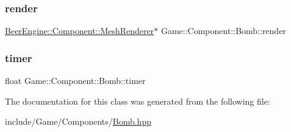 \mbox{\label{class_game_1_1_component_1_1_bomb_ae70ae4cc38793d675183efa64ac25f36}} 
\subsubsection{\texorpdfstring{render}{render}}
{\footnotesize\ttfamily \mbox{\hyperlink{class_beer_engine_1_1_component_1_1_mesh_renderer}{Beer\+Engine\+::\+Component\+::\+Mesh\+Renderer}}$\ast$ Game\+::\+Component\+::\+Bomb\+::render\hspace{0.3cm}{\ttfamily [protected]}}

\mbox{\label{class_game_1_1_component_1_1_bomb_a4c1dc12e98181874a406edd83b98ffa1}} 
\subsubsection{\texorpdfstring{timer}{timer}}
{\footnotesize\ttfamily float Game\+::\+Component\+::\+Bomb\+::timer\hspace{0.3cm}{\ttfamily [protected]}}



The documentation for this class was generated from the following file\+:\begin{DoxyCompactItemize}
\item 
include/\+Game/\+Components/\mbox{\hyperlink{_bomb_8hpp}{Bomb.\+hpp}}\end{DoxyCompactItemize}
